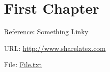 \documentclass{article}
\begin{document}
 
\tableofcontents %
 
\section{First Chapter}
 
Reference: \href{http://www.sharelatex.com}{Something Linky}

URL: \url{http://www.sharelatex.com}

File: \href{run:./file.txt}{File.txt}
 
\end{document}

